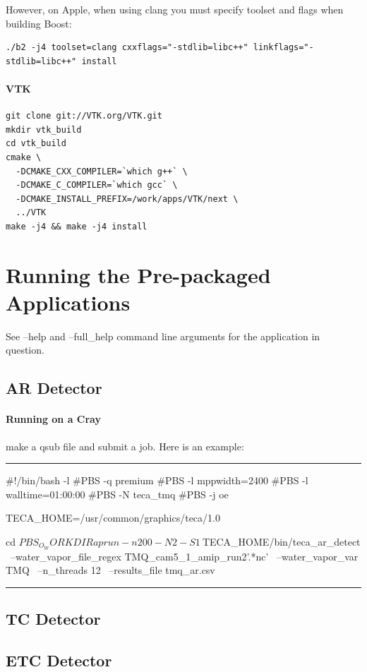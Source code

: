 \documentclass[a4paper,10pt,DIV=12]{scrreprt}
\newenvironment{code}{%
\center
\minipage{0.9\textwidth}
\hrule\vspace{2mm}
\small
\verbatim
}{%
\endverbatim
\vspace{-1mm}\hrule
\endminipage
\endcenter
}
\begin{document}
However, on Apple, when using clang you must specify toolset and flags when
building Boost:

\begin{verbatim}
./b2 -j4 toolset=clang cxxflags="-stdlib=libc++" linkflags="-stdlib=libc++" install
\end{verbatim}

\paragraph{VTK}
\begin{verbatim}
git clone git://VTK.org/VTK.git
mkdir vtk_build
cd vtk_build
cmake \
  -DCMAKE_CXX_COMPILER=`which g++` \
  -DCMAKE_C_COMPILER=`which gcc` \
  -DCMAKE_INSTALL_PREFIX=/work/apps/VTK/next \
  ../VTK
make -j4 && make -j4 install
\end{verbatim}

\section{Running the Pre-packaged Applications}
See --help and --full\_help command line arguments for the application in question.

\subsection{AR Detector}
\paragraph{Running on a Cray}
make a qsub file and submit a job. Here is an example:
\begin{code}
#!/bin/bash -l
#PBS -q premium
#PBS -l mppwidth=2400
#PBS -l walltime=01:00:00
#PBS -N teca_tmq
#PBS -j oe

TECA_HOME=/usr/common/graphics/teca/1.0

cd $PBS_O_WORKDIR
aprun -n 200 -N 2 -S 1 \
    ${TECA_HOME}/bin/teca_ar_detect \
        --water_vapor_file_regex TMQ_cam5_1_amip_run2'.*nc' \
        --water_vapor_var TMQ \
        --n_threads 12 \
        --results_file tmq_ar.csv
\end{code}

\subsection{TC Detector}
\subsection{ETC Detector}
\end{document}
